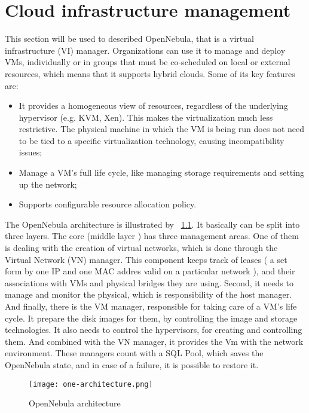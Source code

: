 \chapter{\textbf{Cloud infrastructure management}}


This section will be used to described OpenNebula, that is a virtual infrastructure (VI) manager. Organizations can use it to manage and deploy VMs, individually or in groups that must be co-scheduled on local or external resources, which means that it supports hybrid clouds. Some of its key features are:
\begin{itemize}
 \item It provides a homogeneous view of resources, regardless of the underlying hypervisor (e.g. KVM, Xen). This makes the virtualization much less restrictive. The physical machine in which the VM is being run does not need to be tied to a specific virtualization technology, causing incompatibility issues;
  \item Manage a VM's full life cycle, like managing storage requirements and setting up the network;
  \item Supports configurable resource allocation policy.
\end{itemize}

The OpenNebula architecture is illustrated by ~\ref{fig:open_arch}. It basically can be split into three layers. The core (middle layer ) has three management areas. One of them is dealing with the creation of virtual networks, which is done through the Virtual Network (VN) manager. This component keeps track of leases ( a set form by one IP and one MAC addres valid on a particular network ), and their associations with VMs and physical bridges they are using. Second, it needs to manage and monitor the physical, which is responsibility of the host manager. And finally, there is the VM manager, responsible for taking care of a VM's life cycle. It prepare the disk images for them, by controlling the image and storage technologies. It also needs to control the hypervisors, for creating and controlling them. And combined with the VN manager, it provides the Vm with the network environment. These managers count with a SQL Pool, which saves the OpenNebula state, and in case of a failure, it is possible to restore it.

\begin{figure}[ht]
  \centering
 \texttt{[image: one-architecture.png]}
  \caption{OpenNebula architecture}
  \label{fig:open_arch}
\end{figure}

